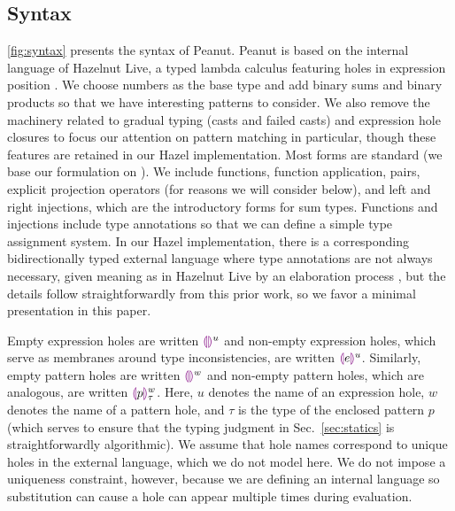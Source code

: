 \subsection{Syntax}
\label{sec:Syntax}
\autoref{fig:syntax} presents the syntax of Peanut.
Peanut is based on the internal language of Hazelnut Live, a typed lambda calculus featuring holes in expression position \cite{DBLP:journals/pacmpl/OmarVCH19}.
We choose numbers as the base type and add binary sums and binary products so that we have interesting
patterns to consider. We also remove the machinery related to gradual typing (casts and failed casts) and expression hole closures to focus our attention on pattern matching in particular, though these features are retained in our Hazel implementation. Most forms are standard (we base our formulation on \cite{Harper2012}). We include functions, function application, pairs, explicit projection operators (for reasons we will consider below), and left and right injections, which are the introductory forms for sum types. Functions and injections include type annotations so that we can define a simple type assignment system. In our Hazel implementation, there is a corresponding bidirectionally typed external language where type annotations are not always necessary, given meaning as in Hazelnut Live by an elaboration process \cite{DBLP:journals/pacmpl/OmarVCH19}, but the details follow straightforwardly from this prior work, so we favor a minimal presentation in this paper. 

Empty expression holes are written $\textcolor{violet}{\llparenthesis}\textcolor{violet}{\rrparenthesis}^{u}$ and non-empty expression holes, which serve as membranes around type inconsistencies, are written $\textcolor{violet}{\llparenthesis} e\textcolor{violet}{\rrparenthesis}^{u}$. Similarly, empty pattern holes are written $\textcolor{violet}{\llparenthesis}\textcolor{violet}{\rrparenthesis}^{w}$ and non-empty pattern holes, which are analogous, are written $\textcolor{violet}{\llparenthesis} p\textcolor{violet}{\rrparenthesis}^{w}_{\tau}$. Here, $u$ denotes the name of an expression hole, $w$ denotes the name of a pattern hole, and $\tau$ is the type of the enclosed pattern $p$ (which serves to ensure that the typing judgment in Sec.~\ref{sec:statics} is straightforwardly algorithmic).
We assume that hole names 
correspond to unique holes in the external language, which we do not model here. We do not impose a uniqueness constraint, however, because we are defining an internal language so substitution can cause a hole can appear multiple times during evaluation.

